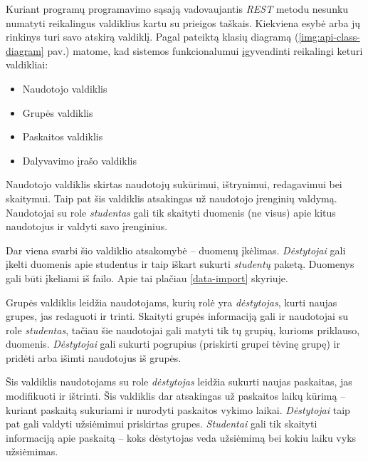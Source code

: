\documentclass{VUMIFPSkursinis}
\begin{document}
Kuriant programų programavimo sąsają vadovaujantis \textit{REST} metodu nesunku numatyti reikalingus valdiklius kartu su prieigos taškais. Kiekviena esybė arba jų rinkinys turi savo atskirą valdiklį. Pagal pateiktą klasių diagramą (\ref{img:api-class-diagram} pav.) matome, kad sistemos funkcionalumui įgyvendinti reikalingi keturi valdikliai:

\begin{itemize}
    \item Naudotojo valdiklis
    \item Grupės valdiklis
    \item Paskaitos valdiklis
    \item Dalyvavimo įrašo valdiklis
\end{itemize}


Naudotojo valdiklis skirtas naudotojų sukūrimui, ištrynimui, redagavimui bei skaitymui. Taip pat šis valdiklis atsakingas už naudotojo įrenginių valdymą. Naudotojai su role \textit{studentas} gali tik skaityti duomenis (ne visus) apie kitus naudotojus ir valdyti savo įrenginius.

Dar viena svarbi šio valdiklio atsakomybė – duomenų įkėlimas. \textit{Dėstytojai} gali įkelti duomenis apie studentus ir taip iškart sukurti \textit{studentų} paketą. Duomenys gali būti įkeliami iš failo. Apie tai plačiau \ref{data-import} skyriuje.


Grupės valdiklis leidžia naudotojams, kurių rolė yra \textit{dėstytojas}, kurti naujas grupes, jas redaguoti ir trinti. Skaityti grupės informaciją gali ir naudotojai su role \textit{studentas}, tačiau šie naudotojai gali matyti tik tų grupių, kurioms priklauso, duomenis. \textit{Dėstytojai} gali sukurti pogrupius (priskirti grupei tėvinę grupę) ir pridėti arba išimti naudotojus iš grupės.


Šis valdiklis naudotojams su role \textit{dėstytojas} leidžia sukurti naujas paskaitas, jas modifikuoti ir ištrinti. Šis valdiklis dar atsakingas už paskaitos laikų kūrimą – kuriant paskaitą sukuriami ir nurodyti paskaitos vykimo laikai. \textit{Dėstytojai} taip pat gali valdyti užsiėmimui priskirtas grupes. \textit{Studentai} gali tik skaityti informaciją apie paskaitą – koks dėstytojas veda užsiėmimą bei kokiu laiku vyks užsiėmimas.

\end{document}
